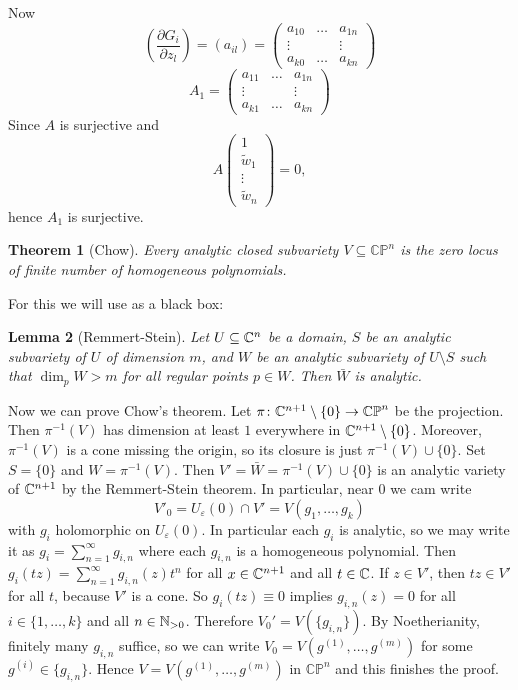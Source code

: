 \documentclass[A4paper, british, reqno]{amsart}
\theoremstyle{darkgreentheorem}
\newtheorem{thm}{Theorem}[section]
\newtheorem{lm}[thm]{Lemma}
\theoremstyle{darkbluedefinition}
\theoremstyle{darkredexample}
\theoremstyle{remark}
\newcommand{\CP}{\mathbb{CP}}
\newcommand{\1}{\mathbbm{1}}
\begin{document}
Now
\[(\frac{\partial G_{i}}{\partial z_{l}})=(a_{il})=\begin{pmatrix} a_{10} & \ldots & a_{1n} \\ \vdots & & \vdots \\ a_{k0} & \ldots & a_{kn}\end{pmatrix}\]
\[A_{1}=\begin{pmatrix} a_{11} & \ldots & a_{1n} \\ \vdots & & \vdots \\ a_{k1} & \ldots & a_{kn} \end{pmatrix}\]
Since $A$ is surjective and 
\[A\begin{pmatrix} 1 \\ \tilde{w}_{1} \\ \vdots \\ \tilde{w}_{n}\end{pmatrix}=0,\]
hence $A_{1}$ is surjective.

\begin{thm}[Chow]
    Every analytic closed subvariety $V\subseteq \CP^{n}$ is the zero locus of finite number of homogeneous polynomials.
\end{thm}

For this we will use as a black box:

\begin{lm}[Remmert-Stein]
    Let $U\subseteq \mathbb{C}^{n}$ be a domain, $S$ be an analytic subvariety of $U$ of dimension $m$, and $W$ be an analytic subvariety of $U\setminus S$ such that $\dim_{p}W>m$ for all regular points $p\in W$.
    Then $\bar{W}$ is analytic.
\end{lm}

Now we can prove Chow's theorem.
Let $\pi\colon \C^{n+1}\setminus \{ 0\}\to \CP^{n}$ be the projection.
Then $\pi^{-1}(V)$ has dimension at least $1$ everywhere in $\mathbb{C}^{n+1}\setminus \{0 \}$.
Moreover, $\pi^{-1}(V)$ is a cone missing the origin, so its closure is just $\pi^{-1}(V)\cup \{0\}$.
Set $S=\{0\}$ and $W=\pi^{-1}(V)$. 
Then $V'=\bar{W}=\pi^{-1}(V)\cup \{0\}$ is an analytic variety of $\mathbb{C}^{n+1}$ by the Remmert-Stein theorem.
In particular, near $0$ we cam write
\[ V'_{0}=U_{\varepsilon}(0)\cap V'=V(g_{1},\ldots,g_{k})\]
with $g_{i}$ holomorphic on $U_{\varepsilon }(0)$.
In particular each $g_{i}$ is analytic, so we may write it as $g_{i}=\sum_{n=1}^{\infty} g_{i,n}$ where each $g_{i,n}$ is a homogeneous polynomial.
Then $g_{i}(tz)=\sum_{n=1}^{\infty}g_{i,n}(z)t^{n}$ for all $x\in \mathbb{C}^{n+1}$ and all $t\in \mathbb{C}$.
If $z\in V'$, then $tz\in V'$ for all $t$, because $V'$ is a cone.
So $g_{i}(tz)\equiv 0$ implies $g_{i,n}(z)=0$ for all $i\in \{1,\ldots,k\}$ and all $n\in \mathbb{N}_{>0}$.
Therefore $V_{0}'=V(\{g_{i,n}\})$.
By Noetherianity, finitely many $g_{i,n}$ suffice, so we can write $V_{0}=V(g^{(1)},\ldots, g^{(m)})$ for some $g^{(i)}\in \{g_{i,n}\}$.
Hence $V=V(g^{(1)},\ldots, g^{(m)})$ in $\CP^{n}$ and this finishes the proof.
\end{document}
